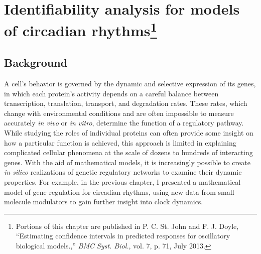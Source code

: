 
\chapter[Identifiability analysis for models of circadian rhythms]{ Identifiability analysis for models of circadian rhythms\footnote{ Portions of this chapter are published in P. C. St. John and F. J. Doyle, ``Estimating confidence intervals in predicted responses for oscillatory biological models.,'' {\itshape BMC Syst. Biol.}, vol. 7, p. 71, July 2013.}}\label{chap:id}

\section{Background}

A cell's behavior is governed by the dynamic and selective expression of its genes, in which each protein's activity depends on a careful balance between transcription, translation, transport, and degradation rates. 
These rates, which change with environmental conditions and are often impossible to measure accurately {\itshape in vivo} or {\itshape in vitro}, determine the function of a regulatory pathway. 
While studying the roles of individual proteins can often provide some insight on how a particular function is achieved, this approach is limited in explaining complicated cellular phenomena at the scale of dozens to hundreds of interacting genes. 
With the aid of mathematical models, it is increasingly possible to create {\itshape in silico} realizations of genetic regulatory networks to examine their dynamic properties.
For example, in the previous chapter, I presented a mathematical model of gene regulation for circadian rhythms, using new data from small molecule modulators to gain further insight into clock dynamics.

